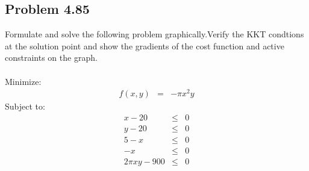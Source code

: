 \documentclass[]{report}
\begin{document}
\subsection*{Problem 4.85}
Formulate and solve the following problem graphically.Verify the KKT condtions at the solution point and show the gradients of the cost function and active constraints on the graph.\\
~
\\
Minimize:
\begin{eqnarray*}
f\left(x,y\right) &=& -\pi x^2 y
\end{eqnarray*} 
Subject to:
\begin{eqnarray*}
x-20 &\leq& 0 \\
y-20 &\leq& 0\\
5-x &\leq& 0\\
-x &\leq& 0\\
2\pi x y -900 &\leq& 0
\end{eqnarray*} 
\end{document}
